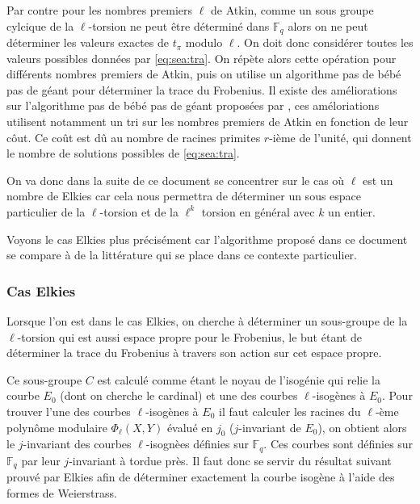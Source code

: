 \documentclass[10pt,a4paper]{book}
\theoremstyle{plain}
\theoremstyle{definition}
\theoremstyle{definition}
\theoremstyle{definition}
\theoremstyle{definition}
\theoremstyle{definition}
\theoremstyle{remark}
\theoremstyle{remark}
\theoremstyle{definition}
\begin{document}
Par contre pour les nombres premiers $\ell$ de Atkin, comme un sous groupe cylcique de la $\ell$-torsion ne peut être déterminé dans $\mathbb{F}_q$ alors on ne peut déterminer les valeurs exactes de $t_{\pi}$ modulo $\ell$. On doit donc considérer toutes les valeurs possibles données par \eqref{eq:sea:tra}. On répète alors cette opération pour  différents nombres premiers de Atkin, puis on utilise un algorithme pas de bébé pas de géant pour déterminer la trace du Frobenius. Il existe des améliorations sur l'algorithme pas de bébé pas de géant proposées par \cite{Ler97a}, ces améloriations utilisent notamment un tri sur les nombres premiers de Atkin en fonction de leur côut. Ce coût est dû au nombre de racines primites $r$-ième de l'unité, qui donnent le nombre de solutions possibles de \eqref{eq:sea:tra}.


On va donc dans la suite de ce document se concentrer sur le cas où $\ell$ est un nombre de Elkies car cela nous permettra de déterminer un sous espace particulier de la $\ell$-torsion et de la $\ell^k$ torsion en général avec $k$ un entier.

Voyons le cas Elkies plus précisément car l'algorithme proposé dans ce document se compare à de la littérature qui se place dans ce contexte particulier.

\subsubsection{Cas Elkies} \label{sub:Elkies}
Lorsque l'on est dans le cas Elkies, on cherche à déterminer un sous-groupe de la $\ell$-torsion qui est aussi espace propre pour le Frobenius, le but étant de déterminer la trace du Frobenius à travers son action sur cet espace propre. 

Ce sous-groupe $C$ est calculé comme étant le noyau de l'isogénie qui relie la courbe $E_0$ (dont on cherche le cardinal) et une des courbes $\ell$-isogènes à $E_0$. Pour trouver l'une des courbes $\ell$-isogènes à $E_0$ il faut calculer les racines du $\ell$-ème polynôme modulaire $\Phi_{\ell}(X,Y)$ évalué en $j_0$ ($j$-invariant de $E_0$), on obtient alors le $j$-invariant des courbes $\ell$-isognèes définies sur $\mathbb{F}_q$. Ces courbes sont définies sur $\mathbb{F}_q$ par leur $j$-invariant à tordue près. Il faut donc se servir du résultat suivant prouvé par Elkies afin de déterminer exactement la courbe isogène à l'aide des formes de Weierstrass.
\end{document}
